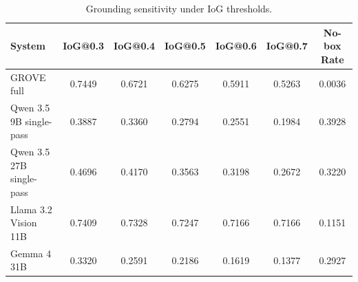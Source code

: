\begin{table}[t]
\centering
\small
\caption{Grounding sensitivity under IoG thresholds.}
\label{tab:iog\_sensitivity}
\begin{tabular}{lcccccc}
\toprule
System & IoG@0.3 & IoG@0.4 & IoG@0.5 & IoG@0.6 & IoG@0.7 & No-box Rate \\
\midrule
GROVE full & 0.7449 & 0.6721 & 0.6275 & 0.5911 & 0.5263 & 0.0036 \\
Qwen 3.5 9B single-pass & 0.3887 & 0.3360 & 0.2794 & 0.2551 & 0.1984 & 0.3928 \\
Qwen 3.5 27B single-pass & 0.4696 & 0.4170 & 0.3563 & 0.3198 & 0.2672 & 0.3220 \\
Llama 3.2 Vision 11B & 0.7409 & 0.7328 & 0.7247 & 0.7166 & 0.7166 & 0.1151 \\
Gemma 4 31B & 0.3320 & 0.2591 & 0.2186 & 0.1619 & 0.1377 & 0.2927 \\
\bottomrule
\end{tabular}
\end{table}
